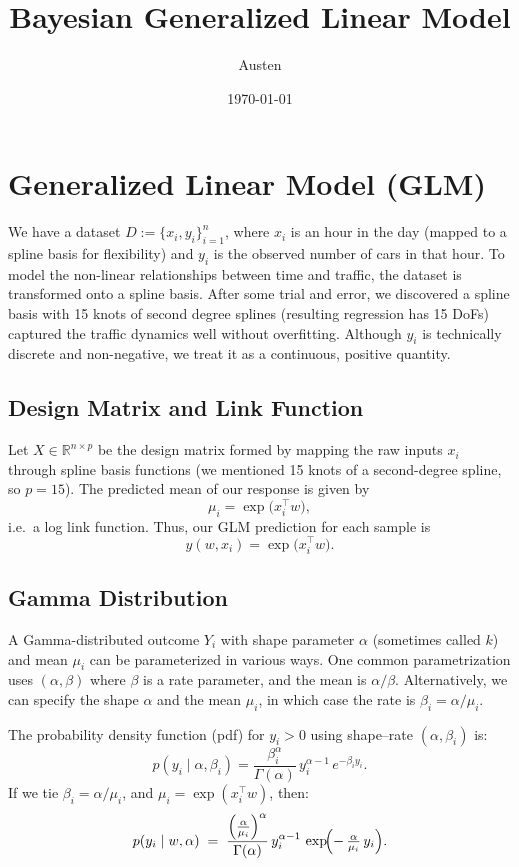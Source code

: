 \documentclass{article}
\title{Bayesian Generalized Linear Model}
\author{Austen}
\date{\today}
\begin{document}
\maketitle

\section{Generalized Linear Model (GLM)}

We have a dataset $D := \{x_i, y_i\}_{i=1}^n$, where $x_i$ is an hour in the day (mapped to a spline basis for flexibility) and $y_i$ is the observed number of cars in that hour. 
To model the non-linear relationships between time and traffic, the dataset is transformed onto a spline basis. After some trial and error, we discovered a spline basis with 15 knots of second degree splines (resulting regression has 15 DoFs) captured the traffic dynamics well without overfitting.
Although $y_i$ is technically discrete and non-negative, we treat it as a continuous, positive quantity.

\subsection{Design Matrix and Link Function}

Let $X \in \mathbb{R}^{n \times p}$ be the design matrix formed by mapping the raw inputs $x_i$ through spline basis functions (we mentioned 15 knots of a second-degree spline, so $p=15$). The predicted mean of our response is given by 
\[
  \mu_i = \exp\bigl(x_i^\top w\bigr),
\]
i.e.\ a log link function. Thus, our GLM prediction for each sample is 
\[
  \hat{y}(w, x_i) = \exp\bigl(x_i^\top w\bigr).
\]

\subsection{Gamma Distribution}

A Gamma-distributed outcome $Y_i$ with shape parameter $\alpha$ (sometimes called $k$) and mean $\mu_i$ can be parameterized in various ways. One common parametrization uses $(\alpha, \beta)$ where $\beta$ is a rate parameter, and the mean is $\alpha / \beta$. Alternatively, we can specify the shape $\alpha$ and the mean $\mu_i$, in which case the rate is $\beta_i = \alpha / \mu_i$. 

The probability density function (pdf) for $y_i > 0$ using shape--rate $(\alpha, \beta_i)$ is:
\[
p(y_i \mid \alpha, \beta_i) 
= \frac{\beta_i^\alpha}{\Gamma(\alpha)} \, y_i^{\alpha -1}\, e^{-\beta_i y_i}.
\]
If we tie $\beta_i = \alpha / \mu_i$, and $\mu_i = \exp(x_i^\top w)$, then:
\[
  p(y_i \mid w, \alpha) 
  \;=\; \frac{\left(\frac{\alpha}{\mu_i}\right)^\alpha}{\Gamma(\alpha)}
  \, y_i^{\alpha -1}\,
  \exp\!\Bigl(-\,\tfrac{\alpha}{\mu_i}\,y_i\Bigr).
\]
\end{document}
